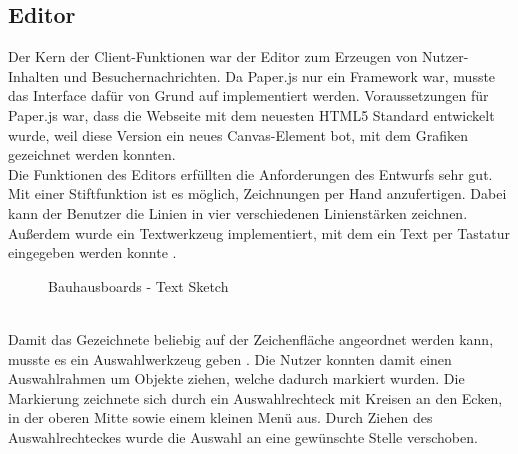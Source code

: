 \subsection{Editor}\label{Editor}
Der Kern der Client-Funktionen war der Editor zum Erzeugen von Nutzer-Inhalten und Besuchernachrichten. Da Paper.js nur ein Framework war, musste das Interface dafür von Grund auf implementiert werden.
Voraussetzungen für Paper.js war, dass die Webseite mit dem neuesten HTML5 Standard entwickelt wurde, weil diese Version ein neues Canvas-Element bot, mit dem Grafiken gezeichnet werden konnten.
\\
Die Funktionen des Editors erfüllten die Anforderungen des Entwurfs sehr gut.
Mit einer Stiftfunktion ist es möglich, Zeichnungen per Hand anzufertigen. Dabei kann der Benutzer die Linien in vier verschiedenen Linienstärken zeichnen.
\\
Außerdem wurde ein Textwerkzeug implementiert, mit dem ein Text per Tastatur eingegeben werden konnte .
\begin{figure}
  \centering
  \caption{Bauhausboards - Text Sketch}
  \label{img:editorTextSketch}
\end{figure}
\\
Damit das Gezeichnete beliebig auf der Zeichenfläche angeordnet werden kann, musste es ein Auswahlwerkzeug geben .
Die Nutzer konnten damit einen Auswahlrahmen um Objekte ziehen, welche dadurch markiert wurden.
Die Markierung zeichnete sich durch ein Auswahlrechteck mit Kreisen an den Ecken, in der oberen Mitte sowie einem kleinen Menü aus.
Durch Ziehen des Auswahlrechteckes wurde die Auswahl an eine gewünschte Stelle verschoben.
